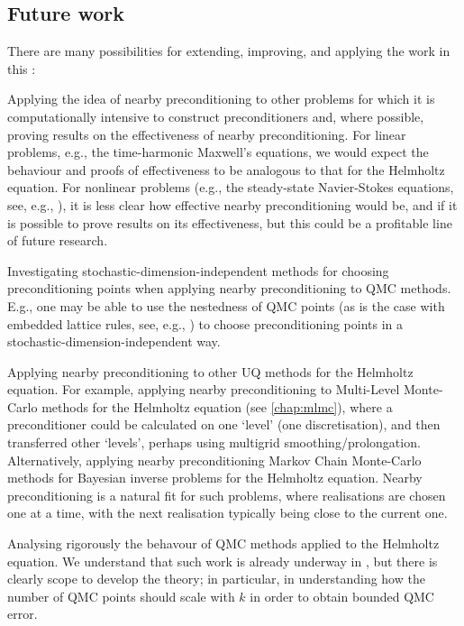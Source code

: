 \subsection{Future work}
There are many possibilities for extending, improving, and applying the work in this :
\bit
\item Applying the idea of nearby preconditioning to other problems for which it is computationally intensive to construct preconditioners and, where possible, proving results on the effectiveness of nearby preconditioning. For linear problems, e.g., the time-harmonic Maxwell's equations, we would expect the behaviour and proofs of effectiveness to be analogous to that for the Helmholtz equation. For nonlinear problems (e.g., the steady-state Navier-Stokes equations, see, e.g., \cite{PoSi:12}), it is less clear how effective nearby preconditioning would be, and if it is possible to prove results on its effectiveness, but this could be a profitable line of future research.
\item Investigating stochastic-dimension-independent methods for choosing preconditioning points when applying nearby preconditioning to QMC methods. E.g., one may be able to use the nestedness of QMC points (as is the case with embedded lattice rules, see, e.g., \cite[Property 3, p.2169]{CoKuNu:06}) to choose preconditioning points in a stochastic-dimension-independent way.
\item Applying nearby preconditioning to other UQ methods for the Helmholtz equation. For example, applying nearby preconditioning to Multi-Level Monte-Carlo methods for the Helmholtz equation (see \cref{chap:mlmc}), where a preconditioner could be calculated on one `level' (one discretisation), and then transferred other `levels', perhaps using multigrid smoothing/prolongation. Alternatively, applying nearby preconditioning Markov Chain Monte-Carlo methods for Bayesian inverse problems for the Helmholtz equation. Nearby preconditioning is a natural fit for such problems, where realisations are chosen one at a time, with the next realisation typically being close to the current one.
  \item Analysing rigorously the behavour of QMC methods applied to the Helmholtz equation. We understand that such work is already underway in \cite{GaKuSl}, but there is clearly scope to develop the theory; in particular, in understanding how the number of QMC points should scale with $k$ in order to obtain bounded QMC error.
\eit
